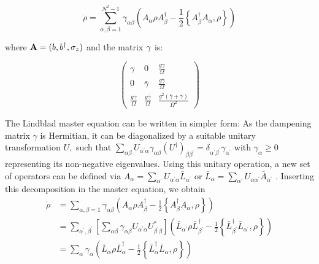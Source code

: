 \documentclass[%
preprint,
onecolumn,
notitlepag,
 amsmath,amssymb,
 aps,
 pra,
]{revtex4-2}
\begin{document}
\begin{equation}
\dot{\rho}=\sum_{\alpha, \beta=1}^{N^{2}-1} \gamma_{\alpha \beta}\left(A_{\alpha} \rho A_{\beta}^{\dagger}-\frac{1}{2}\left\{A_{\beta}^{\dagger} A_{\alpha}, \rho\right\}\right)
\end{equation}
 
where $\bold{A} =(b,b^{\dagger}, \sigma_z) $ and the matrix $\bold{\gamma}$ is: 

\begin{equation}
\left(\begin{array}{ccc}
\gamma & 0 & \frac{g \gamma}{\Omega} \\
0 & \bar{\gamma} & \frac{g \bar{\gamma}}{\Omega} \\
\frac{g \gamma}{\Omega} & \frac{g \bar{\gamma}}{\Omega} & \frac{g^{2}(\bar{\gamma}+\gamma)}{\Omega^{2}}
\end{array}\right)
\end{equation}
 
 
 
The Lindblad master equation can be written in simpler form: As the dampening matrix $\gamma$ is Hermitian, it can be diagonalized by a suitable unitary transformation $U,$ such that $\sum_{\alpha \beta} U_{\alpha^{\prime} \alpha} \gamma_{\alpha \beta}\left(U^{\dagger}\right)_{\beta \beta^{\prime}}=\delta_{\alpha^{\prime} \beta^{\prime}} \gamma_{\alpha^{\prime}}$ with $\gamma_{\alpha} \geq 0$ representing its non-negative eigenvalues. Using this
unitary operation, a new set of operators can be defined via $A_{\alpha}=\sum_{\alpha^{\prime}} U_{\alpha^{\prime} \alpha} \bar{L}_{\alpha^{\prime}}$ or $\bar{L}_{\alpha}=\sum_{\alpha^{\prime}} U_{ \alpha \alpha^{\prime} } \bar{A}_{\alpha^{\prime}}$ . Inserting this decomposition in the master equation, we obtain
$$
\begin{aligned}
\dot{\rho} &=\sum_{\alpha, \beta=1} \gamma_{\alpha \beta}\left(A_{\alpha} \rho A_{\beta}^{\dagger}-\frac{1}{2}\left\{A_{\beta}^{\dagger} A_{\alpha}, \rho\right\}\right) \\
&=\sum_{\alpha^{\prime}, \beta^{\prime}}\left[\sum_{\alpha \beta} \gamma_{\alpha \beta} U_{\alpha^{\prime} \alpha} U_{\beta^{\prime} \beta}^{*}\right]\left(\bar{L}_{\alpha^{\prime}} \rho \bar{L}_{\beta^{\prime}}^{\dagger}-\frac{1}{2}\left\{\bar{L}_{\beta^{\prime}}^{\dagger} \bar{L}_{\alpha^{\prime}}, \rho\right\}\right) \\
&=\sum_{\alpha} \gamma_{\alpha}\left(\bar{L}_{\alpha} \rho \bar{L}_{\alpha}^{\dagger}-\frac{1}{2}\left\{\bar{L}_{\alpha}^{\dagger} \bar{L}_{\alpha}, \rho\right\}\right)
\end{aligned}
$$
 
\end{document}
